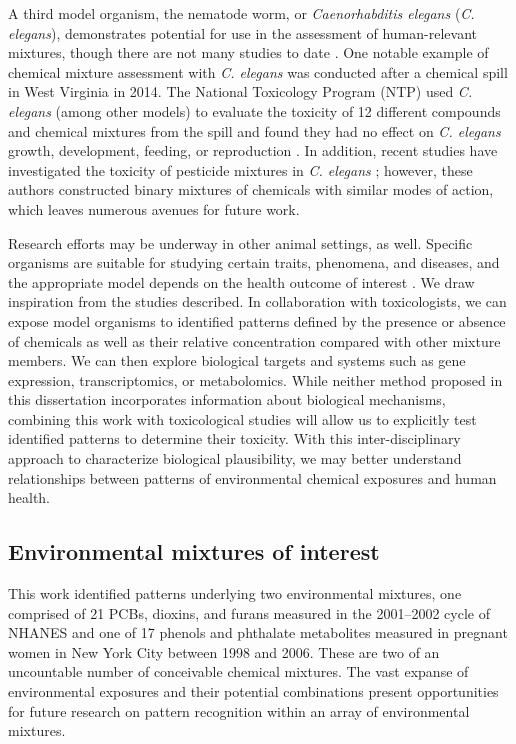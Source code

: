 A third model organism, the nematode worm, or \textit{Caenorhabditis elegans} (\textit{C. elegans}), demonstrates potential for use in the assessment of human-relevant mixtures, though there are not many studies to date \citep{hunt2017c}. One notable example of chemical mixture assessment with \textit{C. elegans} was conducted after a chemical spill in West Virginia in 2014. The National Toxicology Program (NTP) used \textit{C. elegans} (among other models) to evaluate the toxicity of 12 different compounds and chemical mixtures from the spill and found they had no effect on \textit{C. elegans} growth, development, feeding, or reproduction \citep{ntp_worms}. In addition, recent studies have investigated the toxicity of pesticide mixtures in \textit{C. elegans} \citep{wang2021assessing,huang2021combined}; however, these authors constructed binary mixtures of chemicals with similar modes of action, which leaves numerous avenues for future work.
 
Research efforts may be underway in other animal settings, as well. Specific organisms are suitable for studying certain traits, phenomena, and diseases, and the appropriate model depends on the health outcome of interest \citep{katz2016model}. We draw inspiration from the studies described. In collaboration with toxicologists, we can expose model organisms to identified patterns defined by the presence or absence of chemicals as well as their relative concentration compared with other mixture members. We can then explore biological targets and systems such as gene expression, transcriptomics, or metabolomics. While neither method proposed in this dissertation incorporates information about biological mechanisms, combining this work with toxicological studies will allow us to explicitly test identified patterns to determine their toxicity. With this inter-disciplinary approach to characterize biological plausibility, we may better understand relationships between patterns of environmental chemical exposures and human health.

\subsection{Environmental mixtures of interest}
This work identified patterns underlying two environmental mixtures, one comprised of 21 PCBs, dioxins, and furans measured in the 2001--2002 cycle of NHANES and one of 17 phenols and phthalate metabolites measured in pregnant women in New York City between 1998 and 2006. These are two of an uncountable number of conceivable chemical mixtures. The vast expanse of environmental exposures and their potential combinations present opportunities for future research on pattern recognition within an array of environmental mixtures. 

